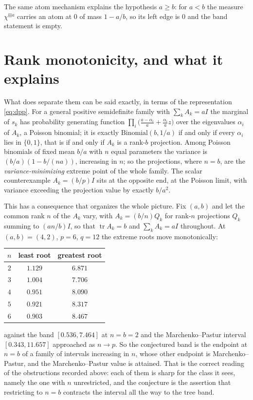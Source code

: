 \documentclass[11pt]{article}
\theoremstyle{remark}
\begin{document}
The same atom mechanism explains the hypothesis $a\ge b$: for $a<b$ the measure
$\chi^{\boxplus a}$ carries an atom at $0$ of mass $1-a/b$, so its left edge is $0$
and the band statement is empty.

\section{Rank monotonicity, and what it explains}\label{sec:rank}

What does separate them can be said exactly, in terms of the representation
\eqref{eq:dpp}. For a general positive semidefinite family with $\sum_kA_k=aI$ the
marginal of $s_k$ has probability generating function
$\prod_i\bigl(\tfrac{a-\alpha_i}{a}+\tfrac{\alpha_i}{a}z\bigr)$ over the eigenvalues
$\alpha_i$ of $A_k$, a Poisson binomial; it is exactly $\mathrm{Binomial}(b,1/a)$ if
and only if every $\alpha_i$ lies in $\{0,1\}$, that is if and only if $A_k$ is a
rank-$b$ projection. Among Poisson binomials of fixed mean $b/a$ with $n$ equal
parameters the variance is $(b/a)(1-b/(na))$, increasing in $n$; so the projections,
where $n=b$, are the \emph{variance-minimizing} extreme point of the whole family.
The scalar counterexample $A_k=(b/p)I$ sits at the opposite end, at the Poisson
limit, with variance exceeding the projection value by exactly $b/a^2$.

This has a consequence that organizes the whole picture. Fix $(a,b)$ and let the
common rank $n$ of the $A_k$ vary, with $A_k=(b/n)Q_k$ for rank-$n$ projections
$Q_k$ summing to $(an/b)I$, so that $\operatorname{tr}A_k=b$ and $\sum_kA_k=aI$
throughout. At $(a,b)=(4,2)$, $p=6$, $q=12$ the extreme roots move monotonically:
\begin{center}
\begin{tabular}{ccc}
\hline
$n$ & least root & greatest root\\
\hline
$2$ & $1.129$ & $6.871$\\
$3$ & $1.004$ & $7.706$\\
$4$ & $0.951$ & $8.090$\\
$5$ & $0.921$ & $8.317$\\
$6$ & $0.903$ & $8.467$\\
\hline
\end{tabular}
\end{center}
against the band $[0.536,7.464]$ at $n=b=2$ and the Marchenko--Pastur interval
$[0.343,11.657]$ approached as $n\to p$. So the conjectured band is the endpoint at
$n=b$ of a family of intervals increasing in $n$, whose other endpoint is
Marchenko--Pastur, and the Marchenko--Pastur value is attained. That is the correct
reading of the obstructions recorded above: each of them is sharp for the class it
sees, namely the one with $n$ unrestricted, and the conjecture is the assertion that
restricting to $n=b$ contracts the interval all the way to the tree band.
\end{document}
